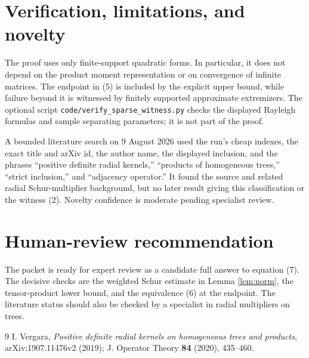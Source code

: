 \documentclass[11pt]{article}
\begin{document}
\section{Verification, limitations, and novelty}

The proof uses only finite-support quadratic forms.  In particular, it does not
depend on the product moment representation or on convergence of infinite
matrices.  The endpoint in (5) is included by the explicit upper bound, while
failure beyond it is witnessed by finitely supported approximate extremizers.
The optional script \texttt{code/verify\_sparse\_witness.py} checks the displayed
Rayleigh formulas and sample separating parameters; it is not part of the
proof.

A bounded literature search on 9 August 2026 used the run's cheap indexes, the
exact title and arXiv id, the author name, the displayed inclusion, and the
phrases ``positive definite radial kernels,'' ``products of homogeneous
trees,'' ``strict inclusion,'' and ``adjacency operator.''  It found the source
and related radial Schur-multiplier background, but no later result giving this
classification or the witness (2).  Novelty confidence is moderate pending
specialist review.

\section{Human-review recommendation}

The packet is ready for expert review as a candidate full answer to equation
(7).  The decisive checks are the weighted Schur estimate in Lemma
\ref{lem:norm}, the tensor-product lower bound, and the equivalence (6) at the
endpoint.  The literature status should also be checked by a specialist in
radial multipliers on trees.

\begin{thebibliography}{9}
I. Vergara,
\emph{Positive definite radial kernels on homogeneous trees and products},
arXiv:1907.11476v2 (2019); J. Operator Theory \textbf{84} (2020), 435--460.
\end{thebibliography}
\end{document}
